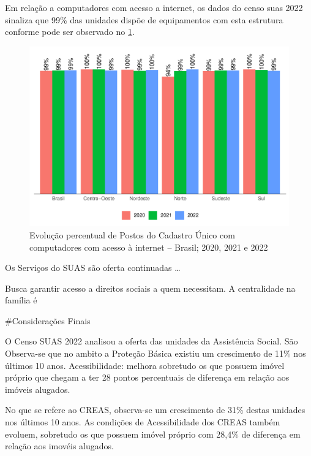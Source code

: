 \documentclass[
  brazilian]{report}
\begin{document}
Em relação a computadores com acesso a internet, os dados do censo suas
2022 sinaliza que 99\% das unidades dispõe de equipamentos com esta
estrutura conforme pode ser observado no
\cref{fig:postcad-internet-percentual}.

\begin{figure}
\includegraphics{Censo-SUAS-2022_files/figure-latex/postcad-internet-percentual-1} \caption[Evolução percentual de Postos do Cadastro Único com computadores com acesso à internet – Brasil]{Evolução percentual de Postos do Cadastro Único com computadores com acesso à internet – Brasil;  2020, 2021 e 2022}\label{fig:postcad-internet-percentual}
\end{figure}

Os Serviços do SUAS são oferta continuadas \ldots{}

Busca garantir acesso a direitos sociais a quem necessitam. A
centralidade na família é 

\#Considerações Finais

O Censo SUAS 2022 analisou a oferta das unidades da Assistência Social.
São Observa-se que no ambito a Proteção Básica existiu um crescimento de
11\% nos últimos 10 anos. Acessibilidade: melhora sobretudo os que
possuem imóvel próprio que chegam a ter 28 pontos percentuais de
diferença em relação aos imóveis alugados.

No que se refere ao CREAS, observa-se um crescimento de 31\% destas
unidades nos últimos 10 anos. As condições de Acessibilidade dos CREAS
também evoluem, sobretudo os que possuem imóvel próprio com 28,4\% de
diferença em relação aos imovéis alugados.
\end{document}
